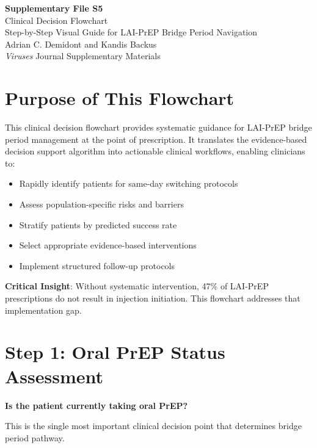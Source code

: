 \documentclass[11pt]{article}
\begin{document}
\begin{center}
{\Huge\bfseries Supplementary File S5}\\[0.3cm]
{\LARGE Clinical Decision Flowchart}\\[0.5cm]
{\large Step-by-Step Visual Guide for LAI-PrEP Bridge Period Navigation}\\[0.3cm]
{\normalsize Adrian C. Demidont and Kandis Backus}\\[0.2cm]
{\small\textit{Viruses} Journal Supplementary Materials}
\end{center}

\vspace{0.5cm}

\section*{Purpose of This Flowchart}

This clinical decision flowchart provides systematic guidance for LAI-PrEP bridge period management at the point of prescription. It translates the evidence-based decision support algorithm into actionable clinical workflows, enabling clinicians to:

\begin{itemize}
\item Rapidly identify patients for same-day switching protocols
\item Assess population-specific risks and barriers
\item Stratify patients by predicted success rate
\item Select appropriate evidence-based interventions
\item Implement structured follow-up protocols
\end{itemize}

\textbf{Critical Insight}: Without systematic intervention, 47\% of LAI-PrEP prescriptions do not result in injection initiation. This flowchart addresses that implementation gap.

\section{Step 1: Oral PrEP Status Assessment}

\begin{tcolorbox}[colback=blue!5!white,colframe=blue!75!black,title=\textbf{INITIAL TRIAGE QUESTION},breakable]
\textbf{Is the patient currently taking oral PrEP?}

This is the single most important clinical decision point that determines bridge period pathway.
\end{tcolorbox}
\end{document}
